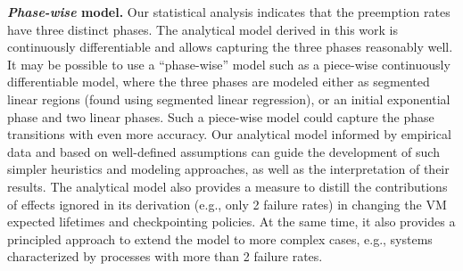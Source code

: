 \noindent \textbf{\emph{Phase-wise} model.}
Our statistical analysis indicates that the preemption rates have three distinct phases. 
The analytical model derived in this work is continuously differentiable and allows capturing the three phases reasonably well. %
It may be possible to use a ``phase-wise'' model such as a piece-wise continuously differentiable model, where the three phases are modeled either as segmented linear regions (found using segmented linear regression), or an initial exponential phase and two linear phases. 
Such a piece-wise model could capture the phase transitions with even more accuracy.
Our analytical model informed by empirical data and based on well-defined assumptions can guide the development of such simpler heuristics and modeling approaches, as well as the interpretation of their results.
The analytical model also provides a measure to distill the contributions of effects ignored in its derivation (e.g., only 2 failure rates) in changing the VM expected lifetimes and checkpointing policies. At the same time, it also provides a principled approach to extend the model to more complex cases, e.g., systems characterized by processes with more than 2 failure rates. %

\begin{comment}
\noindent \textbf{Connection to constrained systems and statistical mechanics.} Our proof of Lemma~\ref{lemma:1} used mapping to constrained physical systems and employed the statistical mechanics tools such as partition functions \cite{krauth2006statistical}. 
We have only presented the initial connection between the behavior of constrained preemptions and the statistical mechanics of constraint-driven phenomena in many particle systems \cite{krauth2006statistical,solis}, and we conjecture that a deeper analogy may exist. 
Central to our proof is the assumption of mutually exclusive preemptions---that is, the provider preempts VMs in a mutually exclusive manner.
This assumption makes sense from a cluster management and application perspective. 
However, analyzing constrained preemptions with weaker versions of the mutual exclusion assumption is \emph{also} possible with statistical mechanics approaches. 
For example, for studies of situations where weakly overlapping preemptions are preferred, one can leverage the statistical mechanics framework of constrained ``soft'' particles often investigated using molecular dynamics simulations \cite{jing2015ionic}.
\end{comment}


